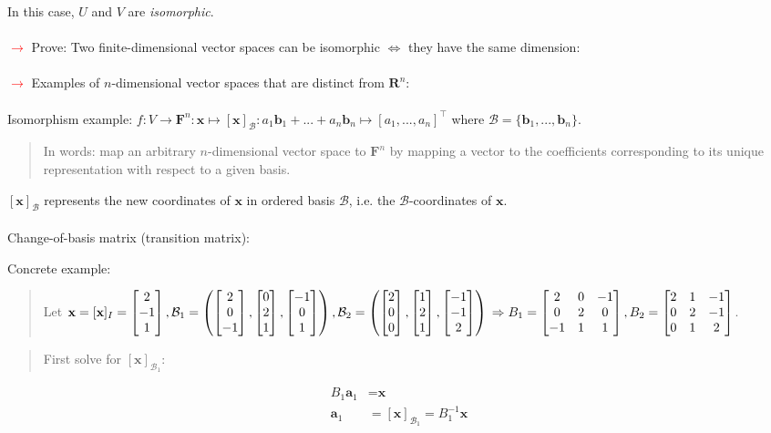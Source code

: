 \documentclass[a4paper]{article}
\newcommand{\inv}{^{-1}}
\newcommand{\x}{\textbf{x}}
\newcommand{\F}{\textbf{F}}
\newcommand{\bv}{\textbf{b}}
\newcommand{\av}{\textbf{a}}
\newcommand{\R}{\textbf{R}}
\newcommand{\att}{\textcolor{red}{$\rightarrow$ }}
\newcommand{\Bcal}{\mathcal{B}}
\newcommand{\bm}[1]{\begin{bmatrix} #1 \end{bmatrix}}
\begin{document}
In this case, $U$ and $V$ are \textit{isomorphic}. \\~\\
\att Prove: Two finite-dimensional vector spaces can be isomorphic $\iff$ they have the same dimension: \\~\\
\att Examples of $n$-dimensional vector spaces that are distinct from $\R^n$: \\~\\
Isomorphism example: $f: V \rightarrow \F^n: \x \mapsto [\x]_\Bcal: a_1 \bv_1+...+a_n \bv_n \mapsto [a_1,...,a_n]^\top $ where $\Bcal=\{\bv_1,...,\bv_n\}$.
\begin{quote}In words: map an arbitrary $n$-dimensional vector space to $\F^n$ by mapping a vector to the coefficients corresponding to its unique representation with respect to a given basis.\end{quote}
$[\x]_\Bcal$ represents the new coordinates of $\x$ in ordered basis $\Bcal$, i.e. the $\Bcal$-coordinates of $\x$.\\~\\
Change-of-basis matrix (transition matrix):
\begin{quote}\end{quote}
Concrete example: 
\begin{quote}Let $\x=[\x]_I=\bm{2\\-1\\1}, \Bcal_1=\left( \bm{2\\0\\-1}, \bm{0\\2\\1}, \bm{-1\\0\\1} \right), \Bcal_2=\left( \bm{2\\0\\0}, \bm{1\\2\\1}, \bm{-1\\-1\\2} \right) \\ \Rightarrow B_1=\bm{2&0&-1\\0&2&0\\-1&1&1}, B_2=\bm{2&1&-1\\0&2&-1\\0&1&2}$.\end{quote}
\begin{quote}First solve for $[\x]_{\Bcal_1}$: \end{quote}
                                                                      \begin{align*}
                                                                      B_1 \av_1&= \x \\ 
                                                                      \av_1 &= [\x]_{\Bcal_1} = B_1\inv \x \\
                                                                      \end{align*}
\end{document}
